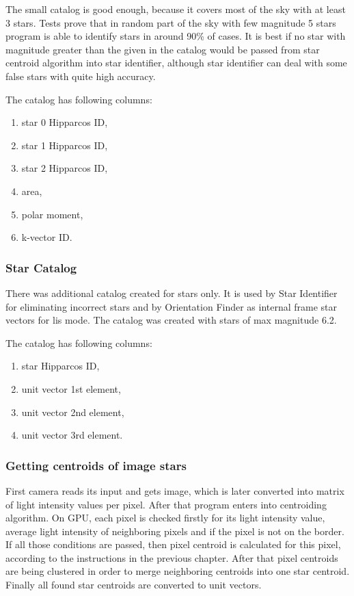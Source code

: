 \documentclass[12pt,a4paper,twoside]{article}
\begin{document}
The small catalog is good enough, because it covers most of the sky with at least 3 stars. Tests prove that in random part of the sky with few magnitude 5 stars program is able to identify stars in around 90\% of cases. It is best if no star with magnitude greater than the given in the catalog would be passed from star centroid algorithm into star identifier, although star identifier can deal with some false stars with quite high accuracy.

The catalog has following columns:
\begin{enumerate}[noitemsep]
\item star 0 Hipparcos ID, 
\item star 1 Hipparcos ID,
\item star 2 Hipparcos ID,
\item area,
\item polar moment,
\item k-vector ID.
\end{enumerate}

\subsubsection{Star Catalog}

There was additional catalog created for stars only. It is used by Star Identifier for eliminating incorrect stars and by Orientation Finder as internal frame star vectors for \gls{lis} mode. The catalog was created with stars of max magnitude 6.2.

The catalog has following columns:
\begin{enumerate}[noitemsep]
\item star Hipparcos ID,
\item unit vector 1st element,
\item unit vector 2nd element, 
\item unit vector 3rd element.
\end{enumerate}

\subsubsection{Getting centroids of image stars}

First camera reads its input and gets image, which is later converted into matrix of light intensity values per pixel. After that program enters into centroiding algorithm. On GPU, each pixel is checked firstly for its light intensity value, average light intensity of neighboring pixels and if the pixel is not on the border. If all those conditions are passed, then pixel centroid is calculated for this pixel, according to the instructions in the previous chapter. After that pixel centroids are being clustered in order to merge neighboring centroids into one star centroid. Finally all found star centroids are converted to unit vectors.
\end{document}
